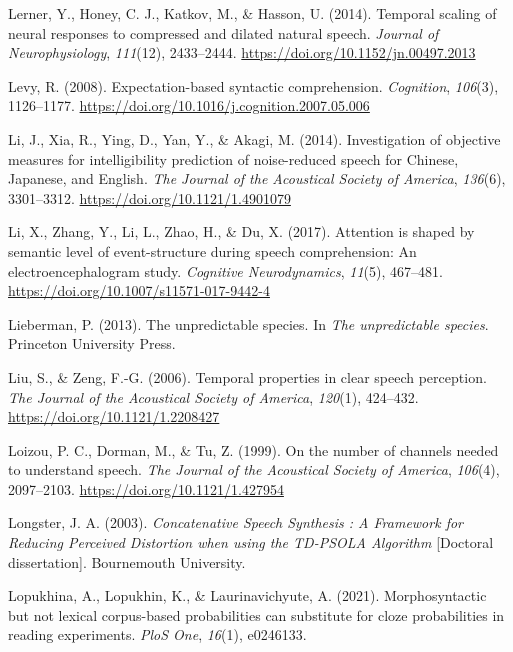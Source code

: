 \documentclass[a4paper, nobind]{templates/ociamthesis}
\newlength{\cslhangindent}
\newenvironment{CSLReferences}[2] %
 {%
  \setlength{\parindent}{0pt}
  \ifodd #1
  \let\oldpar\par
  \def\par{\hangindent=\cslhangindent\oldpar}
  \fi
  \setlength{\parskip}{1mm}
  \setlength{\baselineskip}{6mm}
 }%
 {}
\begin{document}
\begin{CSLReferences}{1}{0}
\leavevmode{}%
Lerner, Y., Honey, C. J., Katkov, M., \& Hasson, U. (2014). {Temporal scaling of neural responses to compressed and dilated natural speech}. \emph{Journal of Neurophysiology}, \emph{111}(12), 2433--2444. \url{https://doi.org/10.1152/jn.00497.2013}

\leavevmode{}%
Levy, R. (2008). Expectation-based syntactic comprehension. \emph{Cognition}, \emph{106}(3), 1126--1177. \url{https://doi.org/10.1016/j.cognition.2007.05.006}

\leavevmode{}%
Li, J., Xia, R., Ying, D., Yan, Y., \& Akagi, M. (2014). {Investigation of objective measures for intelligibility prediction of noise-reduced speech for Chinese, Japanese, and English}. \emph{The Journal of the Acoustical Society of America}, \emph{136}(6), 3301--3312. \url{https://doi.org/10.1121/1.4901079}

\leavevmode{}%
Li, X., Zhang, Y., Li, L., Zhao, H., \& Du, X. (2017). {Attention is shaped by semantic level of event-structure during speech comprehension: An electroencephalogram study}. \emph{Cognitive Neurodynamics}, \emph{11}(5), 467--481. \url{https://doi.org/10.1007/s11571-017-9442-4}

\leavevmode{}%
Lieberman, P. (2013). The unpredictable species. In \emph{The unpredictable species}. Princeton University Press.

\leavevmode{}%
Liu, S., \& Zeng, F.-G. (2006). {Temporal properties in clear speech perception}. \emph{The Journal of the Acoustical Society of America}, \emph{120}(1), 424--432. \url{https://doi.org/10.1121/1.2208427}

\leavevmode{}%
Loizou, P. C., Dorman, M., \& Tu, Z. (1999). On the number of channels needed to understand speech. \emph{The Journal of the Acoustical Society of America}, \emph{106}(4), 2097--2103. \url{https://doi.org/10.1121/1.427954}

\leavevmode{}%
Longster, J. A. (2003). \emph{{Concatenative Speech Synthesis : A Framework for Reducing Perceived Distortion when using the TD-PSOLA Algorithm}} {[}Doctoral dissertation{]}. Bournemouth University.

\leavevmode{}%
Lopukhina, A., Lopukhin, K., \& Laurinavichyute, A. (2021). Morphosyntactic but not lexical corpus-based probabilities can substitute for cloze probabilities in reading experiments. \emph{PloS One}, \emph{16}(1), e0246133.


\end{CSLReferences}
\end{document}
